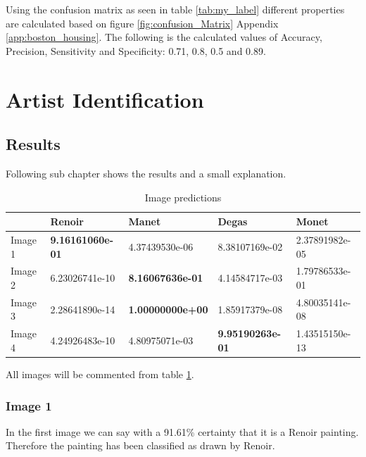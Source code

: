 Using the confusion matrix as seen in table \ref{tab:my_label} different properties are calculated based on figure \ref{fig:confusion_Matrix} Appendix \ref{app:boston_housing}. The following is the calculated values of Accuracy, Precision, Sensitivity and Specificity: 0.71, 0.8, 0.5 and 0.89.

\section{Artist Identification}

\subsection{Results}
\label{section:Results}
Following sub chapter shows the results and a small explanation. 


\begin{table}[H]
    \centering
    \begin{tabular}{|l|l|l|l|l|}
        \hline
         & Renoir & Manet & Degas & Monet \\ \hline
        Image 1 & \textbf{9.16161060e-01} & 4.37439530e-06 & 8.38107169e-02 & 2.37891982e-05 \\ \hline
        Image 2 & 6.23026741e-10 & \textbf{8.16067636e-01} & 4.14584717e-03 & 1.79786533e-01 \\ \hline
        Image 3 & 2.28641890e-14 & \textbf{1.00000000e+00} & 1.85917379e-08 & 4.80035141e-08 \\ \hline
        Image 4 & 4.24926483e-10 & 4.80975071e-03 & \textbf{9.95190263e-01} & 1.43515150e-13 \\ \hline
    \end{tabular}
    \caption{Image predictions}
    \label{tab:image_predictions}
\end{table}

All images will be commented from table \ref{tab:image_predictions}.


\subsubsection*{Image 1}

In the first image we can say with a 91.61\% certainty that it is a Renoir painting. Therefore the painting has been classified as drawn by Renoir.


